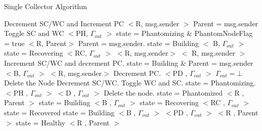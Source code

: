 \begin{algorithm}[H]
\scriptsize
\caption{Single Collector Algorithm}
\label{Node Automaton}
\begin{algorithmic}[1]
	\State Decrement SC/WC and Increment PC
		\State $<$R, msg.sender $>$
	\Else
		\State Parent = msg.sender
			\State Toggle SC and WC
			\State $<$PH, $\Gamma_{out}$ $>$ 
			\State state = Phantomizing \& PhantomNodeFlag = true
		\EndIf
				\State $<$R, Parent$>$
		\EndIf
	\EndIf
{}
		\State Parent = msg.sender.
			\State state = Building
			\State $<$ B,  $\Gamma_{out}$ $>$ 
		\Else
			\State state = Recovering
			\State $<$RC, $\Gamma_{out}$ $>$ 
		\EndIf
			\State $<$R,  msg.sender$>$
		\EndIf
	\Else
		\State $<$ R, msg.sender $>$
	\EndIf
{}
	\State Increment SC/WC and decrement PC.
		\State state = Building \& Parent = msg.sender
		\State  $<$B,  $\Gamma_{out}$ $>$ 
	\Else
		\State  $<$R,  msg.sender$>$
	\EndIf
{}
	\State Decrement PC.
	  \State $<$PD , $\Gamma_{out}$ $>$ 
    $\Gamma_{out} = \bot$
  \EndIf
		\State Delete the Node
	\EndIf
{}
	\State Decrement SC/WC.
		\State Toggle WC and SC.
		\State state = Phantomizing.
		\State $<$PH , $\Gamma_{out}$ $>$
		\State $<$D , $\Gamma_{out}$ $>$	
		\State Delete the node.
	\EndIf
{} 
		\State state = Phantomized
			\State $<$R , Parent $>$
		\Else
				\State state = Building
				\State $<$B , $\Gamma_{out}$ $>$
			\Else
				\State state = Recovering
				\State $<$RC , $\Gamma_{out}$ $>$
			\EndIf
		\EndIf
		\State state = Recovered
			\State state = Building
			\State $<$B , $\Gamma_{out}$ $>$
		\Else
				\State $<$PD , $\Gamma_{out}$ $>$
			\Else	
				\State  $<$R , Parent $>$
			\EndIf
		\EndIf
		\State state = Healthy
			\State  $<$R , Parent $>$
		\EndIf
	\EndIf
\EndIf
\EndProcedure
\end{algorithmic}
\end{algorithm}	


